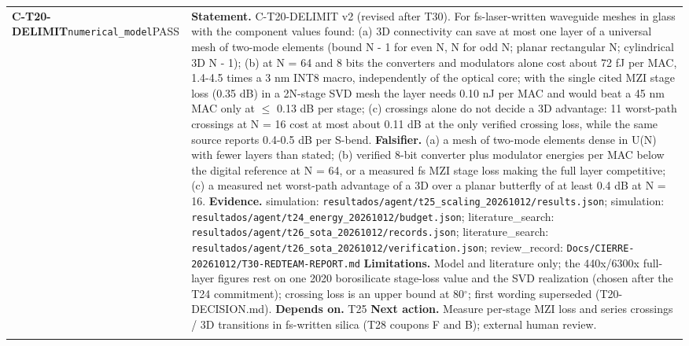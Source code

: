 \begin{longtable}{@{}>{\raggedright\arraybackslash}p{2.35cm}>{\raggedright\arraybackslash}p{13.2cm}@{}}
\textbf{C-T20-DELIMIT}\newline \texttt{numerical\_\allowbreak{}model}\newline PASS & \textbf{Statement.} C-T20-DELIMIT v2 (revised after T30). For fs-laser-written waveguide meshes in glass with the component values found: (a) 3D connectivity can save at most one layer of a universal mesh of two-mode elements (bound N - 1 for even N, N for odd N; planar rectangular N; cylindrical 3D N - 1); (b) at N = 64 and 8 bits the converters and modulators alone cost about 72 fJ per MAC, 1.4-4.5 times a 3 nm INT8 macro, independently of the optical core; with the single cited MZI stage loss (0.35 dB) in a 2N-stage SVD mesh the layer needs 0.10 nJ per MAC and would beat a 45 nm MAC only at $\le$ 0.13 dB per stage; (c) crossings alone do not decide a 3D advantage: 11 worst-path crossings at N = 16 cost at most about 0.11 dB at the only verified crossing loss, while the same source reports 0.4-0.5 dB per S-bend. \newline \textbf{Falsifier.} (a) a mesh of two-mode elements dense in U(N) with fewer layers than stated; (b) verified 8-bit converter plus modulator energies per MAC below the digital reference at N = 64, or a measured fs MZI stage loss making the full layer competitive; (c) a measured net worst-path advantage of a 3D over a planar butterfly of at least 0.4 dB at N = 16. \newline \textbf{Evidence.} simulation: \texttt{resultados/\allowbreak{}agent/\allowbreak{}t25\_\allowbreak{}scaling\_\allowbreak{}20261012/\allowbreak{}results.json}; simulation: \texttt{resultados/\allowbreak{}agent/\allowbreak{}t24\_\allowbreak{}energy\_\allowbreak{}20261012/\allowbreak{}budget.json}; literature\_\allowbreak{}search: \texttt{resultados/\allowbreak{}agent/\allowbreak{}t26\_\allowbreak{}sota\_\allowbreak{}20261012/\allowbreak{}records.json}; literature\_\allowbreak{}search: \texttt{resultados/\allowbreak{}agent/\allowbreak{}t26\_\allowbreak{}sota\_\allowbreak{}20261012/\allowbreak{}verification.json}; review\_\allowbreak{}record: \texttt{Docs/\allowbreak{}CIERRE-20261012/\allowbreak{}T30-REDTEAM-REPORT.md} \newline \textbf{Limitations.} Model and literature only; the 440x/\allowbreak{}6300x full-layer figures rest on one 2020 borosilicate stage-loss value and the SVD realization (chosen after the T24 commitment); crossing loss is an upper bound at 80$^\circ$; first wording superseded (T20-DECISION.md). \newline \textbf{Depends on.} T25 \newline \textbf{Next action.} Measure per-stage MZI loss and series crossings /\allowbreak{} 3D transitions in fs-written silica (T28 coupons F and B); external human review. \\ \addlinespace[2pt]

\end{longtable}
